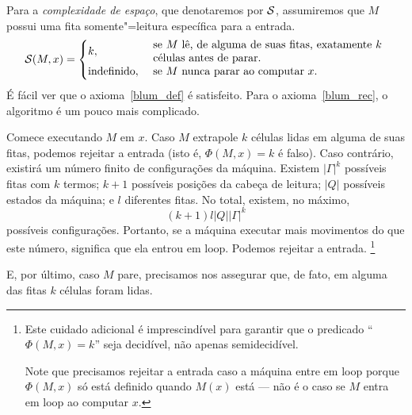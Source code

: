 \begin{example}
    \label{complexidade_espaco}
    Para a \emph{complexidade de espaço},
    que denotaremos por ${\mathcal{S}}$,
    assumiremos que $M$ possui uma fita somente"=leitura
    específica para a entrada.
    \begin{equation*}
        \PhiDS(M, x) = \begin{cases}
            k, & \text{
                \parbox{0.6\textwidth}{%
                    se $M$ lê, de alguma de suas fitas,
                    exatamente $k$ células
                    antes de parar.
                }
            } \\
            \text{indefinido}, & \text{
                \parbox{0.6\textwidth}{
                    se $M$ nunca parar ao computar $x$.
                }
            }
        \end{cases}
    \end{equation*}
    É fácil ver que o axioma~\ref{blum_def} é satisfeito.
    Para o axioma~\ref{blum_rec},
    o algoritmo é um pouco mais complicado.

    Comece executando $M$ em $x$.
    Caso $M$ extrapole $k$ células lidas
    em alguma de suas fitas,
    podemos rejeitar a entrada
    (isto é, $\Phi(M, x) = k$ é falso).
    Caso contrário,
    existirá um número finito de configurações da máquina.
    Existem $|\Gamma|^k$ possíveis fitas com $k$ termos;
    $k+1$ possíveis posições da cabeça de leitura;
    $|Q|$ possíveis estados da máquina;
    e $l$ diferentes fitas.
    No total, existem, no máximo,
    \begin{equation}
        (k+1) l |Q||\Gamma|^k
        \label{num_possiveis_configuracoes}
    \end{equation}
    possíveis configurações.
    Portanto, se a máquina executar
    mais movimentos do que este número,
    significa que ela entrou em loop.
    Podemos rejeitar a entrada.%
    \footnote{
        Este cuidado adicional é imprescindível
        para garantir que o predicado
        ``$\Phi(M, x) = k$''
        seja decidível,
        não apenas semidecidível.

        Note que precisamos rejeitar a entrada
        caso a máquina entre em loop
        porque $\Phi(M, x)$ só está definido
        quando $M(x)$ está
        --- não é o caso se $M$ entra em loop
        ao computar $x$.
    }

    E, por último,
    caso $M$ pare,
    precisamos nos assegurar que,
    de fato,
    em alguma das fitas $k$ células foram lidas.
\end{example}

